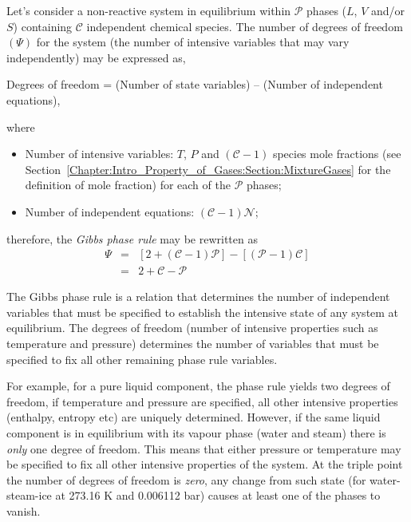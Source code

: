   Let's consider a non-reactive system in equilibrium within $\mathcal{P}$ phases  (\ie $L$, $V$ and/or $S$) containing $\mathcal{C}$ independent chemical species.  The number of degrees of freedom $\left(\Psi\right)$ for the system (\ie the number of intensive variables that may vary independently) may be expressed as,
  \begin{shaded}
    \begin{center}
      Degrees of freedom = (Number of state variables) – (Number of independent equations),
    \end{center}
    \noindent where
    \begin{itemize}
       \item Number of intensive variables: $T$, $P$ and $\left(\mathcal{C}-1\right)$ species mole fractions (see Section~\ref{Chapter:Intro_Property_of_Gases:Section:MixtureGases} for the definition of mole fraction) for each of the $\mathcal{P}$ phases;
        \item Number of independent equations: $\left(\mathcal{C}-1\right)\mathcal{N}$;
    \end{itemize}
    therefore, the {\it Gibbs phase rule} may be rewritten as
    \begin{eqnarray}
       \Psi &=& \left[2 + \left(\mathcal{C}-1\right)\mathcal{P}\right] - \left[\left(\mathcal{P}-1\right)\mathcal{C}\right] \nonumber \\
            &=& 2 + \mathcal{C} - \mathcal{P}\label{Chapter:VolumetricPropertiesPureSubstances:Eqn:PhaseRule}
    \end{eqnarray}  
  \end{shaded}
  The Gibbs phase rule is a relation that determines the number of independent variables that must be specified to establish the intensive state of any system at equilibrium. The degrees of freedom (\ie number of intensive properties such as temperature and pressure) determines the number of variables that must be specified to fix all other remaining phase rule variables. 

For example, for a pure liquid component, the phase rule yields two degrees of freedom, \ie if temperature and pressure are specified, all other intensive properties (\eg enthalpy, entropy etc) are uniquely determined. However, if the same liquid component is in equilibrium with its vapour phase (\eg water and steam) there is {\it only} one degree of freedom. This means that either pressure or temperature may be specified to fix all other intensive properties of the system. At the triple point the number of degrees of freedom is {\it zero}, \ie any change from such state (\eg for water-steam-ice at 273.16 K and 0.006112 bar) causes at least one of the phases to vanish.


